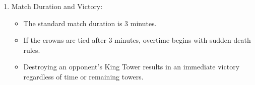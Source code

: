 \documentclass{article}
\begin{document}
\begin{enumerate}[label=\arabic*.]
\begin{itemize}
        \item Air and ground units have separate movement planes, meaning air troops may bypass ground-only defenses if not countered by anti-air.
        \item Troops have attributes such as health, damage per second (DPS), movement speed, attack speed, attack range, and special abilities (e.g., area damage).
    \end{itemize}
    \item Match Duration and Victory:
    \begin{itemize}
        \item The standard match duration is 3 minutes.
        \item If the crowns are tied after 3 minutes, overtime begins with sudden-death rules.
        \item Destroying an opponent’s King Tower results in an immediate victory regardless of time or remaining towers.
    \end{itemize}
\end{enumerate}
\end{document}
